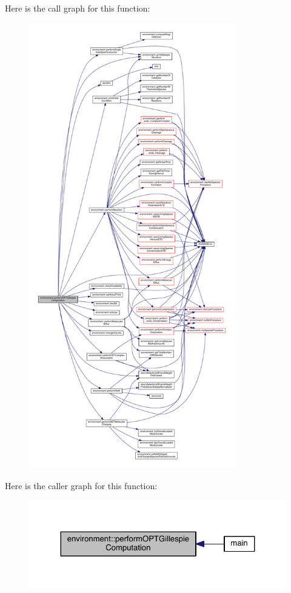 Here is the call graph for this function\-:\nopagebreak
\begin{figure}[H]
\begin{center}
\leavevmode
\includegraphics[height=550pt]{a00014_a90fba3b2cc589f32c97a74540620bd84_cgraph}
\end{center}
\end{figure}




Here is the caller graph for this function\-:\nopagebreak
\begin{figure}[H]
\begin{center}
\leavevmode
\includegraphics[width=324pt]{a00014_a90fba3b2cc589f32c97a74540620bd84_icgraph}
\end{center}
\end{figure}


